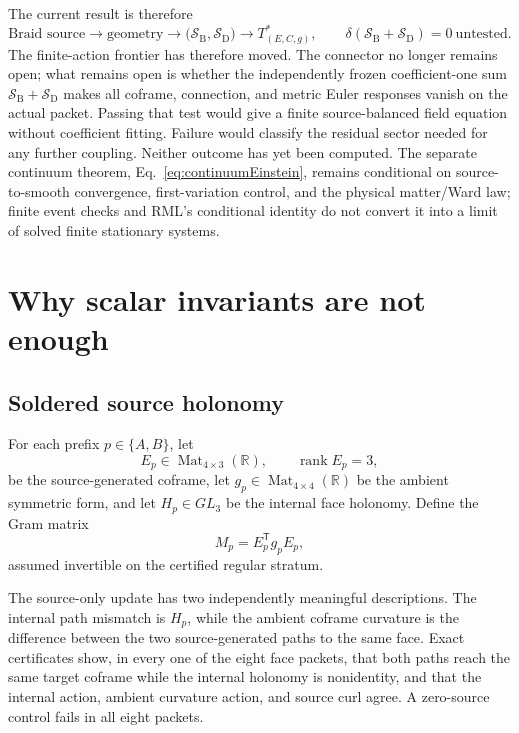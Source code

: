 \documentclass[11pt]{article}
\theoremstyle{definition}
\theoremstyle{remark}
\newcommand{\rank}{\operatorname{rank}}
\begin{document}
The current result is therefore
\begin{equation}\label{eq:frontier}
 \boxed{
 \text{Braid source}\to\text{geometry}
 \to\bigl(\mathcal S_{\mathrm B},\mathcal S_{\mathrm D}\bigr)
 \to T^*_{(E,C,g)},
 \qquad
 \delta\!\left(\mathcal S_{\mathrm B}+\mathcal S_{\mathrm D}\right)=0
 \ \text{untested}.}
\end{equation}
The finite-action frontier has therefore moved. The connector no longer remains open; what remains open is whether the independently frozen coefficient-one sum $\mathcal S_{\mathrm B}+\mathcal S_{\mathrm D}$ makes all coframe, connection, and metric Euler responses vanish on the actual packet. Passing that test would give a finite source-balanced field equation without coefficient fitting. Failure would classify the residual sector needed for any further coupling. Neither outcome has yet been computed. The separate continuum theorem, Eq.~\eqref{eq:continuumEinstein}, remains conditional on source-to-smooth convergence, first-variation control, and the physical matter/Ward law; finite event checks and RML's conditional identity do not convert it into a limit of solved finite stationary systems.

\section{Why scalar invariants are not enough}

\subsection{Soldered source holonomy}

For each prefix $p\in\{A,B\}$, let
\[
 E_p\in\operatorname{Mat}_{4\times3}(\mathbb R),\qquad
 \rank E_p=3,
\]
be the source-generated coframe, let $g_p\in\operatorname{Mat}_{4\times4}(\mathbb R)$ be the ambient symmetric form, and let $H_p\in GL_3$ be the internal face holonomy. Define the Gram matrix
\begin{equation}\label{eq:gram}
 M_p=E_p^{\mathsf T}g_pE_p,
\end{equation}
assumed invertible on the certified regular stratum.

The source-only update has two independently meaningful descriptions. The internal path mismatch is $H_p$, while the ambient coframe curvature is the difference between the two source-generated paths to the same face. Exact certificates show, in every one of the eight face packets, that both paths reach the same target coframe while the internal holonomy is nonidentity, and that the internal action, ambient curvature action, and source curl agree. A zero-source control fails in all eight packets.
\end{document}
